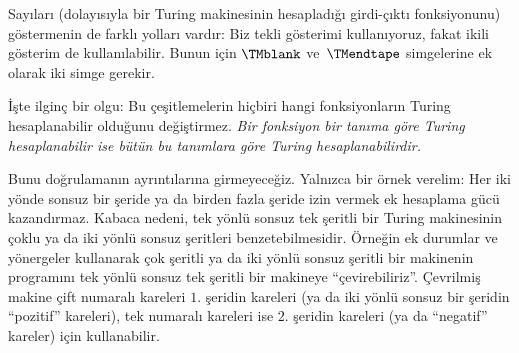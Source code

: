 \documentclass[../../../include/open-logic-section]{subfiles}
\begin{document}
Sayıları (dolayısıyla bir Turing makinesinin hesapladığı girdi-çıktı
fonksiyonunu) göstermenin de farklı yolları vardır: Biz tekli gösterimi
kullanıyoruz, fakat ikili gösterim de kullanılabilir. Bunun için $\TMblank$
ve~$\TMendtape$ simgelerine ek olarak iki simge gerekir.

İşte ilginç bir olgu: Bu çeşitlemelerin hiçbiri hangi fonksiyonların Turing
hesaplanabilir olduğunu değiştirmez. \emph{Bir fonksiyon bir tanıma göre
Turing hesaplanabilir ise bütün bu tanımlara göre Turing hesaplanabilirdir.}

Bunu doğrulamanın ayrıntılarına girmeyeceğiz. Yalnızca bir örnek verelim:
Her iki yönde sonsuz bir şeride ya da birden fazla şeride izin vermek ek
hesaplama gücü kazandırmaz. Kabaca nedeni, tek yönlü sonsuz tek şeritli bir
Turing makinesinin çoklu ya da iki yönlü sonsuz şeritleri benzetebilmesidir.
Örneğin ek durumlar ve yönergeler kullanarak çok şeritli ya da iki yönlü
sonsuz şeritli bir makinenin programını tek yönlü sonsuz tek şeritli bir
makineye ``çevirebiliriz''. Çevrilmiş makine çift numaralı kareleri $1$.
şeridin kareleri (ya da iki yönlü sonsuz bir şeridin ``pozitif'' kareleri),
tek numaralı kareleri ise $2$. şeridin kareleri (ya da ``negatif'' kareler)
için kullanabilir.
\end{document}
